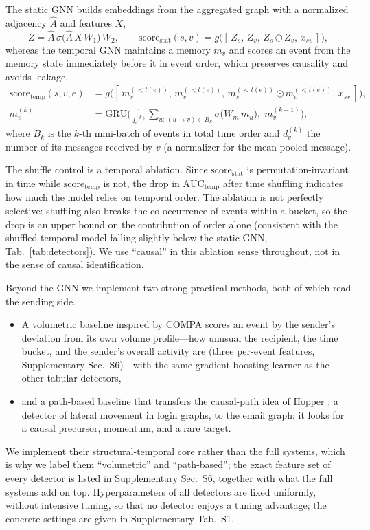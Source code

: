\smallskip The static GNN builds embeddings from the aggregated graph with a normalized
adjacency $\hat{A}$ and features $X$,
\begin{equation}
Z = \hat{A}\,\sigma\!\big(\hat{A}\,X\,W_1\big)\,W_2,
\qquad
\mathrm{score}_{\mathrm{stat}}(s,v) = g\!\big([\,Z_s,\,Z_v,\,Z_s\!\odot\!Z_v,\,x_{sv}\,]\big),
\label{eq:static}
\end{equation}
whereas the temporal GNN maintains a memory $m_v$ and scores an event from the memory state
immediately before it in event order, which preserves causality and avoids leakage,
\begin{align}
\mathrm{score}_{\mathrm{temp}}(s,v,e) &= g\!\big([\,m_s^{(<t(e))},\,m_v^{(<t(e))},\,m_s^{(<t(e))}\!\odot\!m_v^{(<t(e))},\,x_{sv}\,]\big),
\label{eq:temp-score}\\
m_v^{(k)} &= \mathrm{GRU}\!\Big(\tfrac{1}{d_v^{(k)}}\!\!\sum_{u:\,(u\to v)\in B_k}\!\!\sigma\!\big(W_m\,m_u\big),\; m_v^{(k-1)}\Big),
\label{eq:temp-mem}
\end{align}
where $B_k$ is the $k$-th mini-batch of events in total time order and $d_v^{(k)}$ the number of its
messages received by $v$ (a normalizer for the mean-pooled message).

The shuffle control is a temporal ablation. Since $\mathrm{score}_{\mathrm{stat}}$ is permutation-invariant in
time while $\mathrm{score}_{\mathrm{temp}}$ is not, the drop in $\mathrm{AUC}_{\mathrm{temp}}$ after time
shuffling indicates how much the model relies on temporal order. The ablation is not perfectly selective:
shuffling also breaks the co-occurrence of events within a bucket, so the drop is an upper bound on the
contribution of order alone (consistent with the shuffled temporal model falling slightly below the static
GNN, Tab.~\ref{tab:detectors}). We use ``causal'' in this ablation sense throughout, not in the sense of
causal identification.

\smallskip Beyond the GNN we implement two strong practical methods, both of which read the sending side.
\begin{itemize}[noitemsep,topsep=2pt]
  \item A volumetric baseline inspired by COMPA \citep{egele2013compa,stringhini2015thataint} scores an event
  by the sender's deviation from its own volume profile---how unusual the recipient, the time bucket, and the
  sender's overall activity are (three per-event features, Supplementary Sec.~S6)---with the same
  gradient-boosting learner as the other tabular detectors,
  \item and a path-based baseline that transfers the causal-path idea of Hopper \citep{ho2021hopper}, a
  detector of lateral movement in login graphs, to the email graph: it looks for a causal precursor,
  momentum, and a rare target.
\end{itemize}
We implement their structural-temporal core rather than the full systems, which is why we label them ``volumetric'' and
``path-based''; the exact feature set of every detector is listed in Supplementary Sec.~S6, together with what
the full systems add on top. Hyperparameters of all detectors are fixed uniformly, without intensive tuning,
so that no detector enjoys a tuning advantage; the concrete settings are given in Supplementary Tab.~S1.


